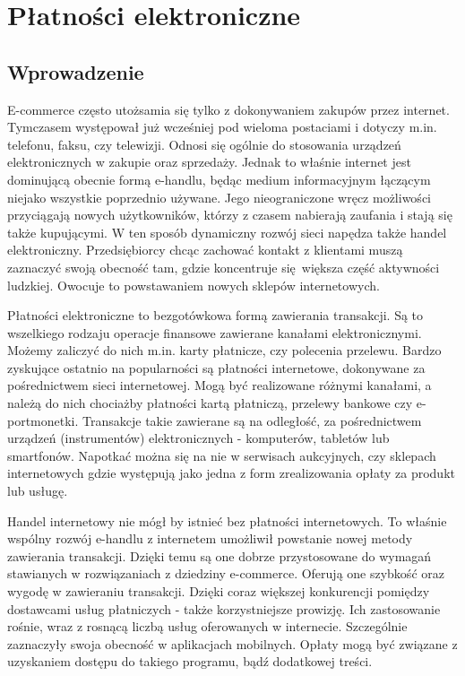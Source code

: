 \section{Płatności elektroniczne}

\subsection{Wprowadzenie}

E-commerce często utożsamia się tylko z dokonywaniem zakupów przez internet. Tymczasem występował już wcześniej pod wieloma postaciami i dotyczy m.in. telefonu, faksu, czy telewizji. Odnosi się ogólnie do stosowania urządzeń elektronicznych w zakupie oraz sprzedaży. Jednak to właśnie internet jest dominującą obecnie formą e-handlu, będąc medium informacyjnym łączącym niejako wszystkie poprzednio używane. Jego nieograniczone wręcz możliwości przyciągają nowych użytkowników, którzy z czasem nabierają zaufania i stają się także kupującymi. W ten sposób dynamiczny rozwój sieci napędza także handel elektroniczny. Przedsiębiorcy chcąc zachować kontakt z klientami muszą zaznaczyć swoją obecność tam, gdzie koncentruje się większa część aktywności ludzkiej. Owocuje to powstawaniem nowych sklepów internetowych.

Płatności elektroniczne to bezgotówkowa formą zawierania transakcji. Są to wszelkiego rodzaju operacje finansowe zawierane kanałami elektronicznymi. Możemy zaliczyć do nich m.in. karty płatnicze, czy polecenia przelewu. Bardzo zyskujące ostatnio na popularności są płatności internetowe, dokonywane za pośrednictwem sieci internetowej. Mogą być realizowane różnymi kanałami, a należą do nich chociażby płatności kartą płatniczą, przelewy bankowe czy e-portmonetki. Transakcje takie zawierane są na odległość, za pośrednictwem urządzeń (instrumentów) elektronicznych - komputerów, tabletów lub smartfonów. Napotkać można się na nie w serwisach aukcyjnych, czy sklepach internetowych gdzie występują jako jedna z form zrealizowania opłaty za produkt lub usługę. 

Handel internetowy nie mógł by istnieć bez płatności internetowych. To właśnie wspólny rozwój e-handlu z internetem umożliwił powstanie nowej metody zawierania transakcji. Dzięki temu są one dobrze przystosowane do wymagań stawianych w rozwiązaniach z dziedziny e-commerce. Oferują one szybkość oraz wygodę w zawieraniu transakcji. Dzięki coraz większej konkurencji pomiędzy dostawcami usług płatniczych - także korzystniejsze prowizję. Ich zastosowanie rośnie, wraz z rosnącą liczbą usług oferowanych w internecie. Szczególnie zaznaczyły swoja obecność w aplikacjach mobilnych. Opłaty mogą być związane z uzyskaniem dostępu do takiego programu, bądź dodatkowej treści.

